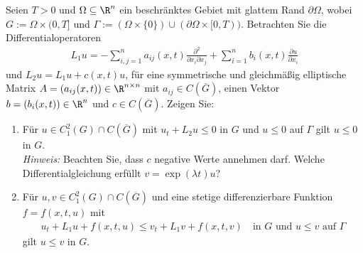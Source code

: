 
\begin{exercise}

Seien $T > 0$ und $\Omega \subseteq \R^n$ ein beschränktes Gebiet mit glattem Rand
$\partial\Omega$, wobei $G := \Omega \times (0,T]$ und
$\Gamma := (\Omega \times \{0\}) \cup (\partial\Omega \times [0,T))$.
Betrachten Sie die Differentialoperatoren
\begin{align*}
  L_1u = -\sum_{i,j=1}^n a_{ij}(x,t)\frac{\partial^2}{\partial x_i \partial x_j}
  + \sum_{i=1}^n b_i(x,t)\frac{\partial u}{\partial x_i}
\end{align*}
und $L_2u = L_1u + c(x,t)u$, für eine symmetrische und gleichmäßig elliptische Matrix
$A = (a_{ij}(x,t)) \in \R^{n\times n}$ mit $a_{ij} \in C(\overline{G})$, einen
Vektor $b = (b_i(x,t)) \in \R^n$ und $c \in C(\overline{G})$. Zeigen Sie:
\begin{enumerate}[label = (\roman*)]
  \item Für $u \in C_1^2(G) \cap C(\overline{G})$ mit $u_t + L_2u \leq 0$ in $G$
  und $u \leq 0$ auf $\Gamma$ gilt $u \leq 0$ in $G$. \\
  \textit{Hinweis:} Beachten Sie, dass $c$ negative Werte annehmen darf.
  Welche Differentialgleichung erfüllt $v = \exp(\lambda t)u$?
  \item Für $u,v \in C_1^2(G) \cap C(\overline{G})$ und eine stetige differenzierbare
  Funktion $f = f(x,t,u)$ mit
  \begin{align*}
    u_t + L_1u + f(x,t,u) \leq v_t + L_1v + f(x,t,v) \quad \text{in } G
    \text{ und } u \leq v \text{ auf } \Gamma
  \end{align*}
  gilt $u \leq v$ in $G$.
\end{enumerate}
\end{exercise}



